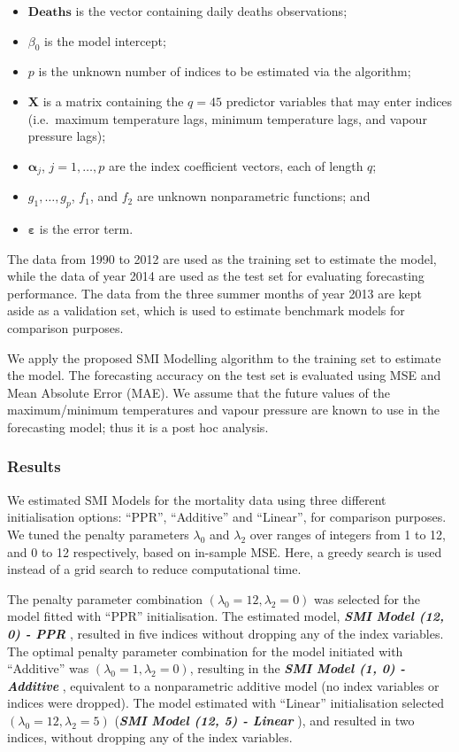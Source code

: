 \documentclass[
  11pt,
  a4paper,
]{article}
\providecommand{\tightlist}{%
  \setlength{\itemsep}{0pt}\setlength{\parskip}{0pt}}\usepackage{longtable,booktabs,array}
\begin{document}
\begin{itemize}
\tightlist
\item
  \(\textbf{Deaths}\) is the vector containing daily deaths
  observations;
\item
  \(\beta_{0}\) is the model intercept;
\item
  \(p\) is the unknown number of indices to be estimated via the
  algorithm;
\item
  \(\bm{X}\) is a matrix containing the \(q=45\) predictor variables
  that may enter indices (i.e.~maximum temperature lags, minimum
  temperature lags, and vapour pressure lags);
\item
  \(\bm{\alpha}_{j}\), \(j = 1, \dots, p\) are the index coefficient
  vectors, each of length \(q\);
\item
  \(g_{1}, \dots,g_p\), \(f_{1}\), and \(f_{2}\) are unknown
  nonparametric functions; and
\item
  \(\bm{\varepsilon}\) is the error term.
\end{itemize}

The data from 1990 to 2012 are used as the training set to estimate the
model, while the data of year 2014 are used as the test set for
evaluating forecasting performance. The data from the three summer
months of year 2013 are kept aside as a validation set, which is used to
estimate benchmark models for comparison purposes.

We apply the proposed SMI Modelling algorithm to the training set to
estimate the model. The forecasting accuracy on the test set is
evaluated using MSE and Mean Absolute Error (MAE). We assume that the
future values of the maximum/minimum temperatures and vapour pressure
are known to use in the forecasting model; thus it is a post hoc
analysis.

\subsubsection{Results}\label{results}

We estimated SMI Models for the mortality data using three different
initialisation options: ``PPR'', ``Additive'' and ``Linear'', for
comparison purposes. We tuned the penalty parameters \(\lambda_{0}\) and
\(\lambda_{2}\) over ranges of integers from 1 to 12, and 0 to 12
respectively, based on in-sample MSE. Here, a greedy search is used
instead of a grid search to reduce computational time.

The penalty parameter combination
\((\lambda_{0} = 12, \lambda_{2} = 0)\) was selected for the model
fitted with ``PPR'' initialisation. The estimated model,
\textbf{\emph{SMI Model (12, 0) - PPR }}, resulted in five indices
without dropping any of the index variables. The optimal penalty
parameter combination for the model initiated with ``Additive'' was
\((\lambda_{0} = 1, \lambda_{2} = 0)\), resulting in the
\textbf{\emph{SMI Model (1, 0) - Additive }}, equivalent to a
nonparametric additive model (no index variables or indices were
dropped). The model estimated with ``Linear'' initialisation selected
\((\lambda_{0} = 12, \lambda_{2} = 5)\) (\textbf{\emph{SMI Model (12, 5)
- Linear }}), and resulted in two indices, without dropping any of the
index variables.
\end{document}
